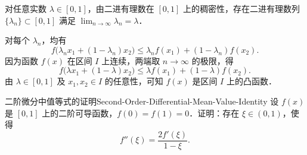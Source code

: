 \begin{myproof}
    对任意实数 $\lambda \in [0, 1]$，由二进有理数在 $[0, 1]$ 上的稠密性，存在二进有理数列 $\{\lambda_n\} \subset [0, 1]$ 满足 $\lim_{n\to\infty} \lambda_n = \lambda$．

    对每个 $\lambda_n$，均有
    \begin{equation}
        f\bigl( \lambda_n x_1 + (1 - \lambda_n)x_2 \bigr) \leqslant \lambda_n f(x_1) + (1 - \lambda_n)f(x_2).
    \end{equation}
    因为函数 $f(x)$ 在区间 $I$ 上连续，两端取 $n \to \infty$ 的极限，得
    \begin{equation}
        f\bigl( \lambda x_1 + (1 - \lambda)x_2 \bigr) \leqslant \lambda f(x_1) + (1 - \lambda)f(x_2).
    \end{equation}
    由 $\lambda \in [0, 1]$ 及 $x_1, x_2 \in I$ 的任意性，可知 $f(x)$ 是区间 $I$ 上的凸函数．
\end{myproof}

\begin{problem}{二阶微分中值等式的证明}{Second-Order-Differential-Mean-Value-Identity}
    设 $f(x)$ 是 $[0, 1]$ 上的二阶可导函数，$f(0) = f(1) = 0$．证明：存在 $\xi \in (0, 1)$，使得
    \begin{equation}
        f''(\xi) = \frac{2f'(\xi)}{1 - \xi}.
    \end{equation}
\end{problem}

